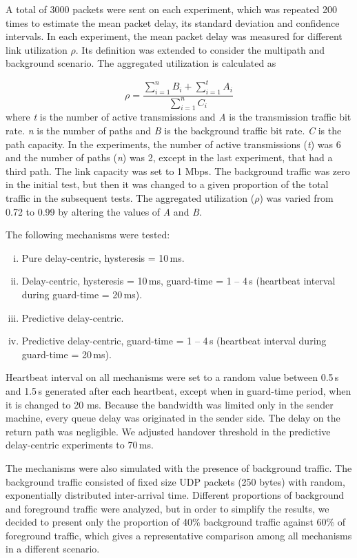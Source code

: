 \documentclass[letterpaper,10pt,oneside,conference,final]{sbrt2015}
\begin{document}
A total of 3000 packets were sent on each experiment, which was repeated 200 times to estimate the mean packet delay, its standard deviation and confidence intervals. In each experiment, the mean packet delay was measured for different link utilization $\rho$. Its definition was extended to consider the multipath and background scenario. The aggregated utilization is calculated as

\begin{equation}
 \rho = \frac{\sum\limits_{i=1}^{n}B_i + \sum\limits_{i=1}^{t}A_i}{\sum\limits_{i=1}^{n}C_i}
\end{equation}
where \textit{t} is the number of active transmissions and \textit{A} is the transmission traffic bit rate. \textit{n} is the number of paths and \textit{B} is the background traffic bit rate. \textit{C} is the path capacity. In the experiments, the number of active transmissions (\textit{t}) was 6 and the number of paths (\textit{n}) was 2, except in the last experiment, that had a third path. The link capacity was set to 1 Mbps. The background traffic was zero in the initial test, but then it was changed to a given proportion of the total traffic in the subsequent tests. The aggregated utilization ($\rho$) was varied from 0.72 to 0.99 by altering the values of \textit{A} and \textit{B}.

The following mechanisms were tested:
\begin{enumerate}[i)]
 \item Pure delay-centric, hysteresis = 10\,ms.
 \item Delay-centric, hysteresis = 10\,ms, guard-time = 1 -- 4\,s (heartbeat interval during guard-time = 20\,ms).
 \item Predictive delay-centric.
 \item Predictive delay-centric, guard-time = 1 -- 4\,s (heartbeat interval during guard-time = 20\,ms).
\end{enumerate}

Heartbeat interval on all mechanisms were set to a random value between 0.5\,s and 1.5\,s generated after each heartbeat, except when in guard-time period, when it is changed to 20 ms.
Because the bandwidth was limited only in the sender machine, every queue delay was originated in the sender side. The delay on the return path was negligible. We adjusted handover threshold in the predictive delay-centric experiments to 70\,ms.

The mechanisms were also simulated with the presence of background traffic. The background traffic consisted of fixed size UDP packets (250 bytes) with random, exponentially distributed inter-arrival time. Different proportions of background and foreground traffic were analyzed, but in order to simplify the results, we decided to present only the proportion of 40\% background traffic against 60\% of foreground traffic, which gives a representative comparison among all mechanisms in a different scenario.
\end{document}

